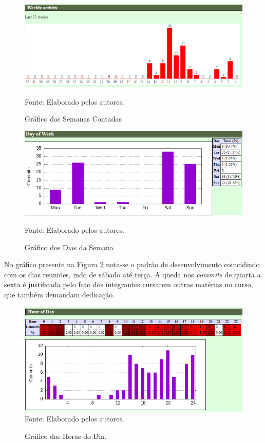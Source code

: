 \documentclass[
    12pt,               %
    openright,          %
    oneside,
    a4paper,            %
    BIBLATEX,           %
    TODO,               %
    english,            %
    brazil              %
    ]{ifsp-spo-inf-ctds}
\begin{document}
    \begin{figure}[H]
            \centering
            \caption{Gráfico das Semanas Contadas}
            \includegraphics[width=1 \textwidth]{Gitstats/documento/semanas contadas.png}
            \label{fig:semanas contadas}
            \centering

        \footnotesize Fonte: Elaborado pelos autores.
    \end{figure}

    \begin{figure}[H]
            \centering
            \caption{Gráfico dos Dias da Semana}
            \includegraphics[width=1 \textwidth]{Gitstats/documento/dias da semana.png}

            \label{fig:diadasemana}
            \centering
            \footnotesize Fonte: Elaborado pelos autores.
    \end{figure} 

    No gráfico presente na Figura \ref{fig:diadasemana} nota-se o padrão de desenvolvimento coincidindo com os dias reuniões, indo de sábado até terça. A queda nos \emph{commits} de quarta a sexta é justificada pelo fato dos integrantes cursarem outras matérias no curso, que também demandam dedicação.

      \begin{figure}[H]
            \centering
            \caption{Gráfico das Horas do Dia.}
            \includegraphics[width=1 \textwidth]{Gitstats/documento/horasdodia.png}
            {\footnotesize Fonte: Elaborado pelos autores.}
            \label{fig:horadodia}
        \end{figure} 
\end{document}
